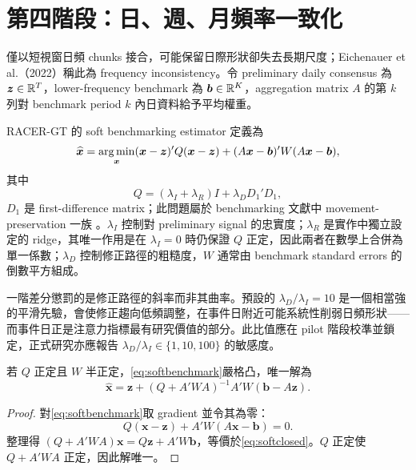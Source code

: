 \documentclass[12pt,a4paper,oneside]{article}
\begin{document}
\section{第四階段：日、週、月頻率一致化}

僅以短視窗日頻 chunks 接合，可能保留日際形狀卻失去長期尺度；Eichenauer et al.（2022）稱此為 frequency inconsistency。令 preliminary daily consensus 為 $\bm z\in\mathbb{R}^T$，lower-frequency benchmark 為 $\bm b\in\mathbb{R}^K$，aggregation matrix $A$ 的第 $k$ 列對 benchmark period $k$ 內日資料給予平均權重。

RACER-GT 的 soft benchmarking estimator 定義為
\begin{equation}
\widehat{\bm x}
=\operatorname*{arg\,min}_{\bm x}
(\bm x-\bm z)'Q(\bm x-\bm z)
+(A\bm x-\bm b)'W(A\bm x-\bm b),
\label{eq:softbenchmark}
\end{equation}
其中
\begin{equation}
Q=(\lambda_I+\lambda_R)I+\lambda_D D_1'D_1,
\end{equation}
$D_1$ 是 first-difference matrix；此問題屬於 benchmarking 文獻中 movement-preservation 一族 \cite{denton1971,chowlin1971,dagum2006}。$\lambda_I$ 控制對 preliminary signal 的忠實度；$\lambda_R$ 是實作中獨立設定的 ridge，其唯一作用是在 $\lambda_I=0$ 時仍保證 $Q$ 正定，因此兩者在數學上合併為單一係數；$\lambda_D$ 控制修正路徑的粗糙度，$W$ 通常由 benchmark standard errors 的倒數平方組成。

一階差分懲罰的是修正路徑的斜率而非其曲率。預設的 $\lambda_D/\lambda_I=10$ 是一個相當強的平滑先驗，會使修正趨向低頻調整，在事件日附近可能系統性削弱日頻形狀——而事件日正是注意力指標最有研究價值的部分。此比值應在 pilot 階段校準並鎖定，正式研究亦應報告 $\lambda_D/\lambda_I\in\{1,10,100\}$ 的敏感度。

\begin{proposition}
若 $Q$ 正定且 $W$ 半正定，\cref{eq:softbenchmark}嚴格凸，唯一解為
\begin{equation}
\widehat{\bm x}
=\bm z+(Q+A'WA)^{-1}A'W(\bm b-A\bm z).
\label{eq:softclosed}
\end{equation}
\end{proposition}

\begin{proof}
對\cref{eq:softbenchmark}取 gradient 並令其為零：
\[
Q(\bm x-\bm z)+A'W(A\bm x-\bm b)=0.
\]
整理得 $(Q+A'WA)\bm x=Q\bm z+A'W\bm b$，等價於\cref{eq:softclosed}。$Q$ 正定使 $Q+A'WA$ 正定，因此解唯一。
\end{proof}
\end{document}

